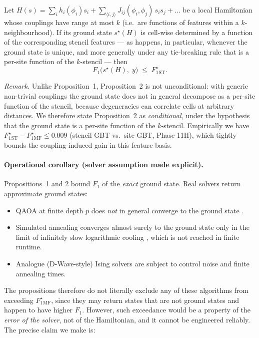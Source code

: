 \documentclass[12pt, a4paper, oneside]{report}
\begin{document}
\begin{tcolorbox}[title={Proposition 2 (Stencil ceiling, conditional).}]
Let $H(s) = \sum_i h_i(\phi_i) s_i + \sum_{\langle i,j \rangle} J_{ij}(\phi_i, \phi_j)\,s_i s_j + \dots$ be a local Hamiltonian whose couplings have range at most $k$ (i.e.\ are functions of features within a $k$-neighbourhood). If its ground state $s^{\star}(H)$ is cell-wise determined by a function of the corresponding stencil features --- as happens, in particular, whenever the ground state is unique, and more generally under any tie-breaking rule that is a per-site function of the $k$-stencil --- then
\[
    F_1\!\bigl(s^{\star}(H),\; y\bigr) \;\le\; F_1^{\star}_{\mathrm{ST}}.
\]
\end{tcolorbox}

\noindent\emph{Remark.}
Unlike Proposition~1, Proposition~2 is not unconditional: with generic non-trivial couplings the ground state does not in general decompose as a per-site function of the stencil, because degeneracies can correlate cells at arbitrary distances. We therefore state Proposition~2 as \emph{conditional}, under the hypothesis that the ground state is a per-site function of the $k$-stencil. Empirically we have $F_1^{\star}_{\mathrm{ST}} - F_1^{\star}_{\mathrm{MF}} \le 0.009$ (stencil GBT vs.\ site GBT, Phase 11H), which tightly bounds the coupling-induced gain in this feature basis.

\paragraph{Operational corollary (solver assumption made explicit).}
Propositions~1 and 2 bound $F_1$ of the \emph{exact} ground state. Real solvers return approximate ground states:
\begin{itemize}
    \item QAOA at finite depth $p$ does \emph{not} in general converge to the ground state \cite{farhi2014,zhou2020qaoa}.
    \item Simulated annealing converges almost surely to the ground state only in the limit of infinitely slow logarithmic cooling \cite{geman1984sa}, which is not reached in finite runtime.
    \item Analogue (D-Wave-style) Ising solvers are subject to control noise and finite annealing times.
\end{itemize}
The propositions therefore do not literally exclude any of these algorithms from exceeding $F_1^{\star}_{\mathrm{MF}}$, since they may return states that are not ground states and happen to have higher $F_1$. However, such exceedance would be a property of the \emph{error of the solver}, not of the Hamiltonian, and it cannot be engineered reliably. The precise claim we make is:
\end{document}
